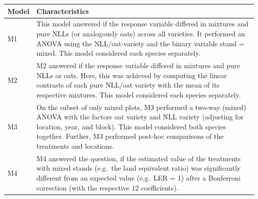 \documentclass[
  british,
  a4paper,
  DIV=11,
  numbers=noendperiod]{scrreprt}
\begin{document}
\begin{longtable}[]{@{}
  >{\raggedright\arraybackslash}p{}
  >{\raggedright\arraybackslash}p{}@{}}
\toprule\noalign{}
\begin{minipage}[b]{\linewidth}\raggedright
Model
\end{minipage} & \begin{minipage}[b]{\linewidth}\raggedright
Characteristics
\end{minipage} \\
\midrule\noalign{}
\endhead
\bottomrule\noalign{}
\endlastfoot
M1 & This model answered if the response variable differed in mixtures
and pure NLLs (or analogously oats) across all varieties. It performed
an ANOVA using the NLL/oat-variety and the binary variable stand =
mixed. This model considered each species separately. \\
M2 & M2 answered if the response variable differed in mixtures and pure
NLLs or oats. Here, this was achieved by computing the linear contrasts
of each pure NLL/oat variety with the mean of its respective mixtures.
This model considered each species separately. \\
M3 & On the subset of only mixed plots, M3 performed a two-way (mixed)
ANOVA with the factors oat variety and NLL variety (adjusting for
location, year, and block). This model considered both species together.
Further, M3 performed post-hoc comparisons of the treatments and
locations. \\
M4 & M4 answered the question, if the estimated value of the treatments
with mixed stands (e.g.~the land equivalent ratio) was significantly
different from an expected value (e.g.~LER = 1) after a Bonferroni
correction (with the respective 12 coefficients). \\
\end{longtable}

\begin{table}

\caption{\label{tbl-yield-locationyear}}


\end{table}%
\end{document}
